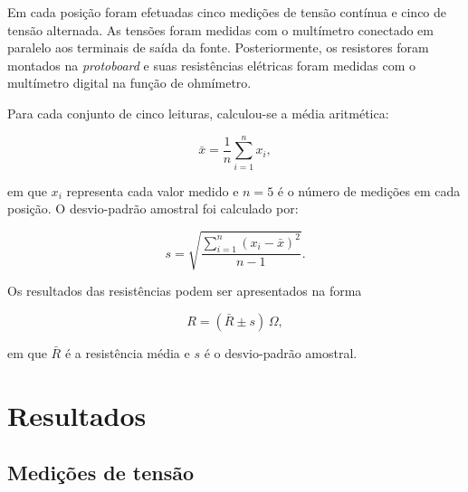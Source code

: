 \documentclass[a4paper,12pt]{article}
\begin{document}
Em cada posição foram efetuadas cinco medições de tensão contínua e cinco de
tensão alternada. As tensões foram medidas com o multímetro conectado em paralelo
aos terminais de saída da fonte. Posteriormente, os resistores foram montados na
\textit{protoboard} e suas resistências elétricas foram medidas com o multímetro
digital na função de ohmímetro.

Para cada conjunto de cinco leituras, calculou-se a média aritmética:

\[
  \bar{x}=\frac{1}{n}\sum_{i=1}^{n}x_i,
\]

em que $x_i$ representa cada valor medido e $n=5$ é o número de medições em
cada posição. O desvio-padrão amostral foi calculado por:

\[
  s=\sqrt{\frac{\sum_{i=1}^{n}(x_i-\bar{x})^2}{n-1}}.
\]

Os resultados das resistências podem ser apresentados na forma

\[
  R=(\bar{R}\pm s)\,\Omega,
\]

em que $\bar{R}$ é a resistência média e $s$ é o desvio-padrão amostral.

\section{Resultados}

\subsection{Medições de tensão}
\end{document}
